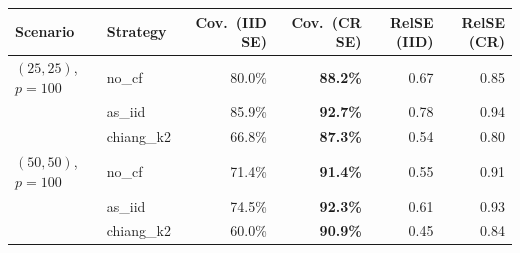 \begin{tabular}{llrrrr}
\toprule
\textbf{Scenario} & \textbf{Strategy} & \textbf{Cov.\ (IID SE)} & \textbf{Cov.\ (CR SE)} & \textbf{RelSE (IID)} & \textbf{RelSE (CR)} \\
\midrule
  $(25,25)$, $p=100$ & no\_cf & 80.0\% & \textbf{88.2\%} & 0.67 & 0.85 \\
   & as\_iid & 85.9\% & \textbf{92.7\%} & 0.78 & 0.94 \\
   & chiang\_k2 & 66.8\% & \textbf{87.3\%} & 0.54 & 0.80 \\
\midrule
  $(50,50)$, $p=100$ & no\_cf & 71.4\% & \textbf{91.4\%} & 0.55 & 0.91 \\
   & as\_iid & 74.5\% & \textbf{92.3\%} & 0.61 & 0.93 \\
   & chiang\_k2 & 60.0\% & \textbf{90.9\%} & 0.45 & 0.84 \\
\bottomrule
\end{tabular}